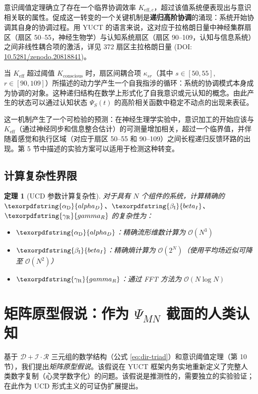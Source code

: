 \documentclass[11pt,a4paper]{article}
\newtheorem{theorem}{定理}
\DeclareRobustCommand{\alD}{\texorpdfstring{\ensuremath{\alpha_{\mathrm{D}}}}{alpha_D}}
\DeclareRobustCommand{\beI}{\texorpdfstring{\ensuremath{\beta_{\mathrm{I}}}}{beta_I}}
\DeclareRobustCommand{\gaR}{\texorpdfstring{\ensuremath{\gamma_{\mathrm{R}}}}{gamma_R}}
\newcommand{\eff}{\mathrm{eff}}
\begin{document}
	意识阈值定理确立了存在一个临界协调效率 \(K_{\eff,c}\)，超过该值系统便表现出与意识相关联的属性。促成这一转变的一个关键机制是\textbf{递归高阶协调}的涌现：系统开始协调其自身的协调过程。用 YUCT 的语言来说，这对应于拉格朗日量中神经集群扇区（扇区 50--55，神经生物学）与认知系统扇区（扇区 90--109，认知与信息系统）之间非线性耦合项的激活，详见 372 扇区主拉格朗日量 (DOI: \href{https://doi.org/10.5281/zenodo.20818841}{10.5281/zenodo.20818841})。
	
	当 \(K_{\eff}\) 超过阈值 \(K_{\mathrm{conscious}}\) 时，扇区间耦合项 \(\kappa_{sr}\)（其中 \(s\in[50,55]\), \(r\in[90,109]\)）所描述的动力学产生一个自我指涉的循环：系统的协调模式本身成为协调的对象。这种递归结构在数学上形式化了自我意识或元认知的概念。由此产生的状态可以通过认知状态 \(\Psi_S(t)\) 的高阶相关函数中稳定不动点的出现来表征。
	
	这一机制产生了一个可检验的预测：在神经生理学实验中，意识加工的开始应该与 \(K_{\eff}\)（通过神经同步和信息整合估计）的可测量增加相关，超过一个临界值，并伴随着感觉和执行区域（对应于扇区 50--55 和 90--109）之间长程递归反馈环路的出现。第 5 节中描述的实验方案可以适用于检测这种转变。
	
	\subsection{计算复杂性界限}
	
	\begin{theorem}[UCD 参数计算复杂性]
		对于具有 \(N\) 个组件的系统，计算精确的 \(\alD\)、\(\beI\)、\(\gaR\) 的复杂性为：
		\begin{itemize}
			\item \(\alD\)：精确流形维数计算为 \(\mathcal{O}(N^3)\)
			\item \(\beI\)：精确熵计算为 \(\mathcal{O}(2^N)\)（使用平均场近似可降至 \(\mathcal{O}(N^2)\)）
			\item \(\gaR\)：通过 FFT 方法为 \(\mathcal{O}(N \log N)\)
		\end{itemize}
	\end{theorem}
	
	\section{矩阵原型假说：作为 \(\Psi_{MN}\) 截面的人类认知}
	\label{sec:matrix}
	
	基于 \(\mathcal{D}+\mathcal{I}\cdot\mathcal{R}\) 三元组的数学结构（公式 \ref{eq:dir-triad}）和意识阈值定理（第 10 节），我们提出\textit{矩阵原型假说}。该假说在 YUCT 框架内务实地重新定义了完整人类数字复制（心灵学数字化）的问题。该假说是推测性的，需要独立的实验验证；在此作为 UCD 形式主义的可证伪扩展提出。
	
\end{document}
